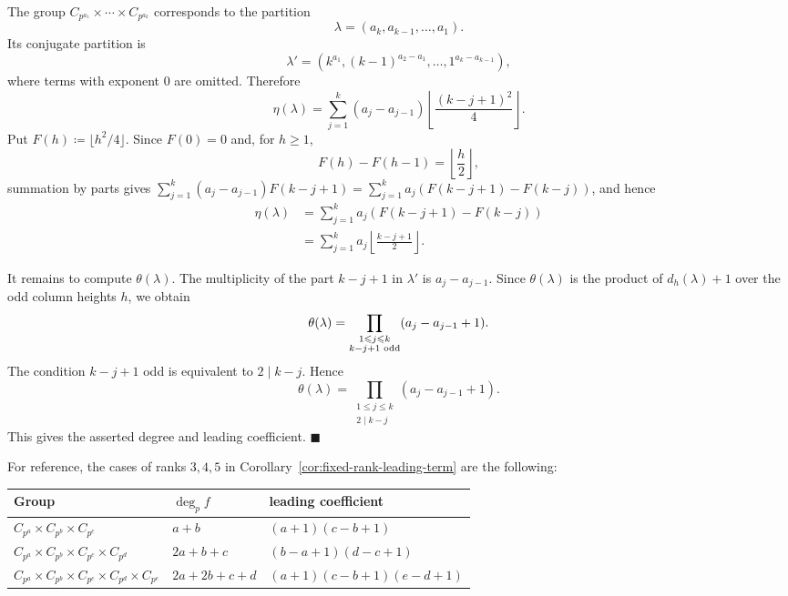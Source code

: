 \documentclass[a4paper,11pt,reqno]{amsart}
\theoremstyle{plain}
\theoremstyle{remark}
\numberwithin{equation}{section}
\renewcommand{\leq}{\leqslant}
\renewcommand{\geq}{\geqslant}
\newenvironment{proofof}{{\bf Proof. }}{\hfill $\blacksquare$ \\}
\begin{document}
\begin{proofof}
The group $C_{p^{a_1}}\times\cdots\times C_{p^{a_k}}$ corresponds to the
partition
\[
        \lambda=(a_k,a_{k-1},\ldots,a_1).
\]
Its conjugate partition is
\[
        \lambda'
        =
        (k^{a_1},(k-1)^{a_2-a_1},\ldots,1^{a_k-a_{k-1}}),
\]
where terms with exponent $0$ are omitted. Therefore
\[
        \eta(\lambda)
        =
        \sum_{j=1}^k
        (a_j-a_{j-1})
        \left\lfloor\frac{(k-j+1)^2}{4}\right\rfloor.
\]
Put $F(h)\coloneqq\lfloor h^2/4\rfloor$. Since $F(0)=0$ and, for $h\geq 1$,
\[
        F(h)-F(h-1)=\left\lfloor\frac{h}{2}\right\rfloor,
\]
summation by parts gives
$\sum_{j=1}^k(a_j-a_{j-1})F(k-j+1)=
\sum_{j=1}^k a_j(F(k-j+1)-F(k-j))$, and hence
\[
\begin{split}
        \eta(\lambda)
        &=
        \sum_{j=1}^k
        a_j
        \left(
        F(k-j+1)-F(k-j)
        \right)  \\
        &=
        \sum_{j=1}^k
        a_j\left\lfloor\frac{k-j+1}{2}\right\rfloor.
\end{split}
\]

It remains to compute $\theta(\lambda)$. The multiplicity of the part
$k-j+1$ in $\lambda'$ is $a_j-a_{j-1}$. Since $\theta(\lambda)$ is the product
of $d_h(\lambda)+1$ over the odd column heights $h$, we obtain
\[
        \theta(\lambda)
        =
        \prod_{\substack{1\leq j\leq k\\ k-j+1\textnormal{ odd}}}
        (a_j-a_{j-1}+1).
\]
The condition $k-j+1$ odd is equivalent to $2\mid k-j$. Hence
\[
        \theta(\lambda)
        =
        \prod_{\substack{1\leq j\leq k\\ 2\mid k-j}}
        (a_j-a_{j-1}+1).
\]
This gives the asserted degree and leading coefficient.
\end{proofof}

For reference, the cases of ranks $3,4,5$ in
Corollary~\ref{cor:fixed-rank-leading-term} are the following:
\begin{center}
\begin{tabular}{@{}lll@{}}
\toprule
Group & $\deg_p f$ & leading coefficient \\
\midrule
$C_{p^a}\times C_{p^b}\times C_{p^c}$
&
$a+b$
&
$(a+1)(c-b+1)$
\\[2pt]
$C_{p^a}\times C_{p^b}\times C_{p^c}\times C_{p^d}$
&
$2a+b+c$
&
$(b-a+1)(d-c+1)$
\\[2pt]
$C_{p^a}\times C_{p^b}\times C_{p^c}\times C_{p^d}\times C_{p^e}$
&
$2a+2b+c+d$
&
$(a+1)(c-b+1)(e-d+1)$
\\
\bottomrule
\end{tabular}
\end{center}
\end{document}

